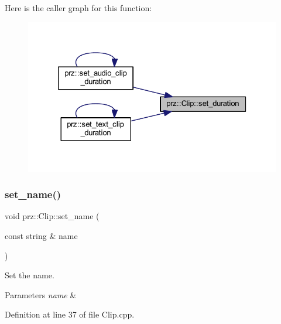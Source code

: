 Here is the caller graph for this function\+:
\nopagebreak
\begin{figure}[H]
\begin{center}
\leavevmode
\includegraphics[width=326pt]{classprz_1_1_clip_a7555fe34e45f6032ea282ca6d605ace6_icgraph}
\end{center}
\end{figure}
\mbox{\label{classprz_1_1_clip_a4228c95183be5c9e2bd9eabd58828243}} 
\subsubsection{\texorpdfstring{set\_name()}{set\_name()}}
{\footnotesize\ttfamily void prz\+::\+Clip\+::set\+\_\+name (\begin{DoxyParamCaption}\item[{const string \&}]{name }\end{DoxyParamCaption})}



Set the name. 


\begin{DoxyParams}{Parameters}
{\em name} & \\
\hline
\end{DoxyParams}


Definition at line 37 of file Clip.\+cpp.

